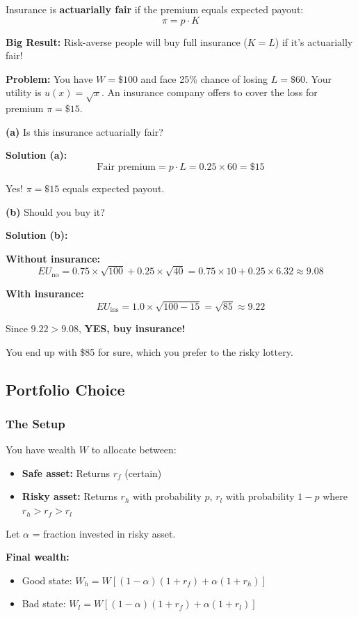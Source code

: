 \documentclass[10pt,letterpaper]{article}
\begin{document}
Insurance is \textbf{actuarially fair} if the premium equals expected payout:
\[
\boxed{\pi = p \cdot K}
\]

\textbf{Big Result:} Risk-averse people will buy full insurance ($K = L$) if it's actuarially fair!

\begin{examplebox}
\textbf{Problem:} You have $W = \$100$ and face 25\% chance of losing $L = \$60$. Your utility is $u(x) = \sqrt{x}$. An insurance company offers to cover the loss for premium $\pi = \$15$.

\textbf{(a)} Is this insurance actuarially fair?

\textbf{Solution (a):}
\[
\text{Fair premium} = p \cdot L = 0.25 \times 60 = \$15
\]

Yes! $\pi = \$15$ equals expected payout.

\textbf{(b)} Should you buy it?

\textbf{Solution (b):}

\textbf{Without insurance:}
\[
EU_{\text{no}} = 0.75 \times \sqrt{100} + 0.25 \times \sqrt{40} = 0.75 \times 10 + 0.25 \times 6.32 \approx 9.08
\]

\textbf{With insurance:}
\[
EU_{\text{ins}} = 1.0 \times \sqrt{100 - 15} = \sqrt{85} \approx 9.22
\]

Since $9.22 > 9.08$, \textbf{YES, buy insurance!}

You end up with \$85 for sure, which you prefer to the risky lottery.
\end{examplebox}

\subsection{Portfolio Choice}

\subsubsection{The Setup}

You have wealth $W$ to allocate between:
\begin{itemize}
  \item \textbf{Safe asset:} Returns $r_f$ (certain)
  \item \textbf{Risky asset:} Returns $r_h$ with probability $p$, $r_l$ with probability $1-p$ where $r_h > r_f > r_l$
\end{itemize}

Let $\alpha$ = fraction invested in risky asset.

\textbf{Final wealth:}
\begin{itemize}
  \item Good state: $W_h = W[(1-\alpha)(1+r_f) + \alpha(1+r_h)]$
  \item Bad state: $W_l = W[(1-\alpha)(1+r_f) + \alpha(1+r_l)]$
\end{itemize}
\end{document}
